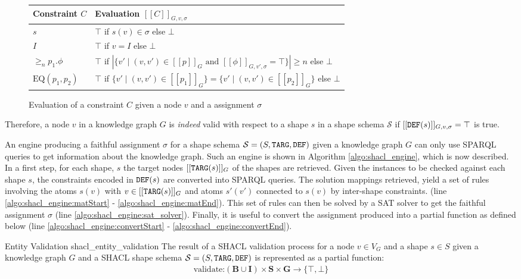 \begin{figure}[h] %
    \centering
         \begin{tabular}{l|l}
             \toprule
             Constraint $C$ & Evaluation $[[C]]_{G,v,\sigma}$ \\
             \midrule
             \midrule
              $s$ & $\top$ if $s(v) \in \sigma$ else $\bot$ \\
              $I$ & $\top$ if $v = I$ else $\bot$\\
              ${\geq}_n p_1.\phi$ & $\top$ if $|\{v' \mid (v,v') \in [[p]]_G \text{ and } [[\phi]]_{G,v',\sigma} = \top \}| \geq n$ else $\bot$\\
              $\text{EQ}(p_1,p_2)$ & $\top$ if $\{v' \mid (v,v') \in [[p_1]]_G\} = \{v' \mid (v,v') \in [[p_2]]_G\}$ else $\bot$\\
             \bottomrule
        \end{tabular}
    \caption{Evaluation of a constraint $C$ given a node $v$ and a assignment $\sigma$ \cite{corman2018semantics}}
    \label{shacl_evaluation_of_constraints}
\end{figure}

Therefore, a node $v$ in a knowledge graph $G$ is \emph{indeed} valid with respect to a shape $s$ in a shape schema $\mathcal{S}$ if $[[\texttt{DEF}(s)]]_{G,v,\sigma} = \top$ is true.

An engine producing a faithful assignment $\sigma$ for a shape schema $\mathcal{S} = (S, \texttt{TARG}, \texttt{DEF})$ given a knowledge graph $G$ can only use SPARQL queries to get information about the knowledge graph. Such an engine is shown in Algorithm \ref{algo:shacl_engine}, which is now described. 
In a first step, for each shape, $s$ the target nodes $[[\texttt{TARG}(s)]]_G$ of the shapes are retrieved. Given the instances to be checked against each shape $s$, the constraints encoded in $\texttt{DEF}(s)$ are converted into SPARQL queries. The solution mappings retrieved, yield a set of rules involving the atoms $s(v)$ with $v \in [[\texttt{TARG}(s)]]_G$ and atoms $s'(v')$ connected to $s(v)$ by inter-shape constraints. (line \ref{algo:shacl_engine:matStart} - \ref{algo:shacl_engine:matEnd}).
This set of rules can then be solved by a SAT solver to get the faithful assignment $\sigma$ (line \ref{algo:shacl_engine:sat_solver}). Finally, it is useful to convert the assignment produced into a partial function as defined below (line \ref{algo:shacl_engine:convertStart} - \ref{algo:shacl_engine:convertEnd}).
\begin{Def}{Entity Validation \cite{valSPARQL}}{shacl_entity_validation}
The result of a SHACL validation process for a node $v \in V_G$ and a shape $s \in S$ given a knowledge graph $G$ and a SHACL shape schema $\mathcal{S} = (S, \texttt{TARG}, \texttt{DEF})$ is represented as a partial function:
\begin{gather*}
    \text{validate:} (\mathbf{B} \cup \mathbf{I}) \times \mathbf{S} \times \mathbf{G} \to \{\top, \bot\}
\end{gather*}
\end{Def}

